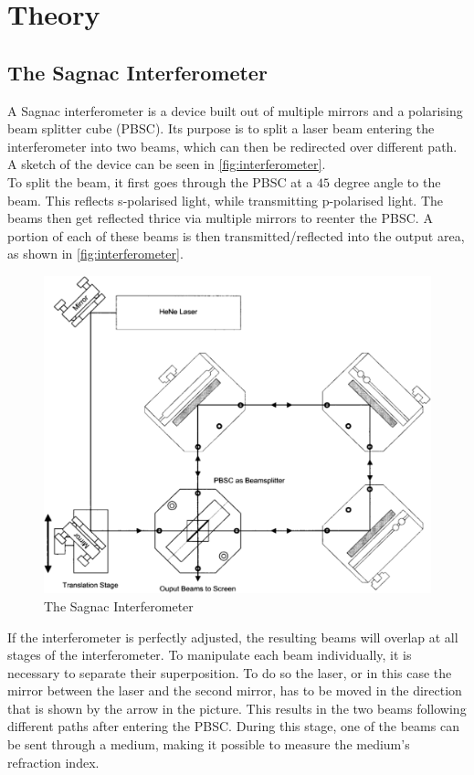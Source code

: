 \section{Theory}
\label{sec:Theory}
\subsection{The Sagnac Interferometer}
\label{sec:The_Sagnac_Interferometer}
A Sagnac interferometer is a device built out of multiple mirrors and a polarising beam splitter cube (PBSC). Its purpose is to split a laser beam entering the interferometer into two beams, which can then be redirected over different path. A sketch of the device can be seen in \autoref{fig:interferometer}.\\
To split the beam, it first goes through the PBSC at a $45$ degree angle to the beam. This reflects s-polarised light, while transmitting p-polarised light. The beams then get reflected thrice via multiple mirrors to reenter the PBSC. A portion of each of these beams is then transmitted/reflected into the output area, as shown in \autoref{fig:interferometer}.\\
\begin{figure}
\includegraphics[width=\linewidth]{./figures/aufbau.pdf}
\caption{The Sagnac Interferometer}
\label{fig:interferometer}
\end{figure}
If the interferometer is perfectly adjusted, the resulting beams will overlap at all stages of the interferometer. To manipulate each beam individually, it is necessary to separate their superposition. To do so the laser, or in this case the mirror between the laser and the second mirror, has to be moved in the direction that is shown by the arrow in the picture. This results in the two beams following different paths after entering the PBSC. During this stage, one of the beams can be sent through a medium, making it possible to measure the medium's refraction index.\\
